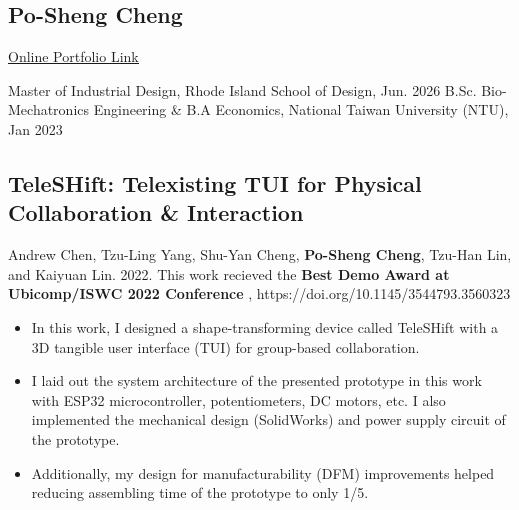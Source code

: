 \documentclass[12pt]{article}
\begin{document}
\begin{multicols}{2}
    \section*{Po-Sheng Cheng}
    \href{https://bencer3283.github.io/art/}{\underline{Online Portfolio Link}}
    
    \columnbreak
    {\sffamily \noindent
    Master of Industrial Design, Rhode Island School of Design, Jun. 2026 \newline
    B.Sc. Bio-Mechatronics Engineering \& \newline B.A Economics, National Taiwan University (NTU), Jan 2023
    }
\end{multicols}
    \subsection*{TeleSHift: Telexisting TUI for Physical Collaboration \& Interaction}
    {\sffamily
    {\footnotesize Andrew Chen, Tzu-Ling Yang, Shu-Yan Cheng, \textbf{Po-Sheng Cheng}, Tzu-Han Lin, and Kaiyuan Lin. 2022. This work recieved the \textbf{Best Demo Award at Ubicomp/ISWC 2022 Conference}%
    , https://doi.org/10.1145/3544793.3560323}
        \begin{itemize}
            \item In this work, I designed a shape-transforming device called TeleSHift with a 3D tangible user interface (TUI) for group-based collaboration.
            \item I laid out the system architecture of the presented prototype in this work with ESP32 microcontroller, potentiometers, DC motors, etc. I also implemented the mechanical design (SolidWorks) and power supply circuit of the prototype.
            \item Additionally, my design for manufacturability (DFM) improvements helped reducing assembling time of the prototype to only 1/5.
        \end{itemize}
        }
\end{document}

